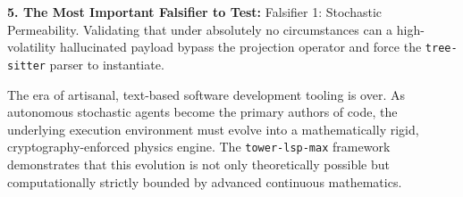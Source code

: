 \textbf{5. The Most Important Falsifier to Test:}
Falsifier 1: Stochastic Permeability. Validating that under absolutely no circumstances can a high-volatility hallucinated payload bypass the projection operator and force the \texttt{tree-sitter} parser to instantiate.

The era of artisanal, text-based software development tooling is over. As autonomous stochastic agents become the primary authors of code, the underlying execution environment must evolve into a mathematically rigid, cryptography-enforced physics engine. The \texttt{tower-lsp-max} framework demonstrates that this evolution is not only theoretically possible but computationally strictly bounded by advanced continuous mathematics.
